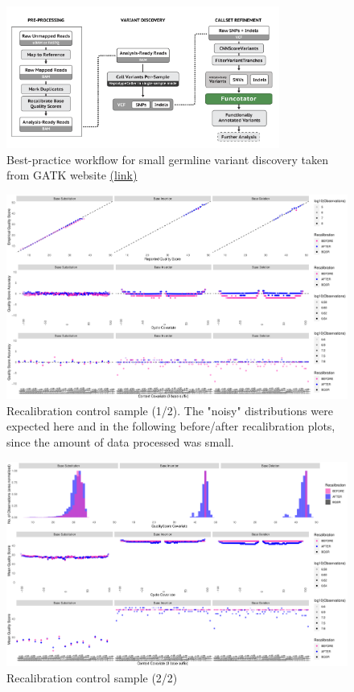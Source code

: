 \documentclass[11pt]{article}
\begin{document}
\begin{figure}[h]
   \centering
   \includegraphics[width=0.8\textwidth]{images/variant_calling_pipeline.png}
   \caption{\footnotesize{Best-practice workflow for small germline variant discovery taken from GATK website \href{https://gatk.broadinstitute.org/hc/en-us/articles/360035535932}{(link)} }}
   \label{pipeline_germline_variant}
\end{figure}


\begin{figure}[h]
   \centering
   \includegraphics[width=\textwidth]{images/recal_control_1_setup1.png}
   \caption{\footnotesize{Recalibration control sample (1/2). The "noisy" distributions were expected here and in the following before/after recalibration plots, since the amount of data processed was small.}}
   \label{recal_control_1}
\end{figure}

\begin{figure}[h]
   \centering
   \includegraphics[width=\textwidth]{images/recal_control_2_setup1.png}
   \caption{\footnotesize{Recalibration control sample (2/2)}}
   \label{recal_control_2}
\end{figure}
\end{document}
